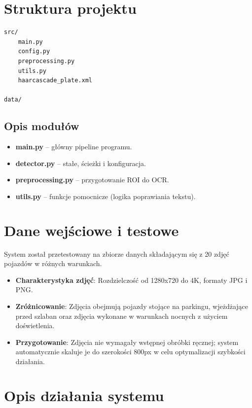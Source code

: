 \documentclass[12pt,a4paper]{article}
\begin{document}
\section{Struktura projektu}

\begin{verbatim}
src/
    main.py
    config.py
    preprocessing.py
    utils.py
    haarcascade_plate.xml

data/
\end{verbatim}

\subsection{Opis modułów}

\begin{itemize}
    \item \textbf{main.py} – główny pipeline programu.
    \item \textbf{detector.py} – stałe, ścieżki i konfiguracja.
    \item \textbf{preprocessing.py} – przygotowanie ROI do OCR.
    \item \textbf{utils.py} – funkcje pomocnicze (logika poprawiania tekstu).
\end{itemize}

\section{Dane wejściowe i testowe}

System został przetestowany na zbiorze danych składającym się z 20 zdjęć pojazdów w różnych warunkach.
\begin{itemize}
    \item \textbf{Charakterystyka zdjęć}: Rozdzielczość od 1280x720 do 4K, formaty JPG i PNG.
    \item \textbf{Zróżnicowanie}: Zdjęcia obejmują pojazdy stojące na parkingu, wjeżdżające przed szlaban oraz zdjęcia wykonane w warunkach nocnych z użyciem doświetlenia.
    \item \textbf{Przygotowanie}: Zdjęcia nie wymagały wstępnej obróbki ręcznej; system automatycznie skaluje je do szerokości 800px w celu optymalizacji szybkości działania.
\end{itemize}
\section{Opis działania systemu}
\end{document}
